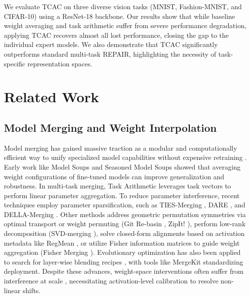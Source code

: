 \documentclass{article}
\theoremstyle{plain}
\theoremstyle{definition}
\theoremstyle{remark}
\begin{document}
We evaluate TCAC on three diverse vision tasks (MNIST, Fashion-MNIST, and CIFAR-10) using a ResNet-18 backbone. Our results show that while baseline weight averaging and task arithmetic suffer from severe performance degradation, applying TCAC recovers almost all lost performance, closing the gap to the individual expert models. We also demonstrate that TCAC significantly outperforms standard multi-task REPAIR, highlighting the necessity of task-specific representation spaces.

\section{Related Work}
\label{sec:related}

\subsection{Model Merging and Weight Interpolation}
Model merging has gained massive traction as a modular and computationally efficient way to unify specialized model capabilities without expensive retraining \cite{wortsman2022robust, ilharco2022editing, merger_survey2024}. Early work like Model Soups \cite{wortsman2022fi} and Seasoned Model Soups \cite{sharma2024seasoning} showed that averaging weight configurations of fine-tuned models can improve generalization and robustness. In multi-task merging, Task Arithmetic \cite{ilharco2022editing} leverages task vectors to perform linear parameter aggregation. To reduce parameter interference, recent techniques employ parameter sparsification, such as TIES-Merging \cite{yadav2023ties}, DARE \cite{yu2024dare}, and DELLA-Merging \cite{fan2024della}. Other methods address geometric permutation symmetries via optimal transport or weight permuting (Git Re-basin \cite{ainsworth2022git}, ZipIt! \cite{stoica2023zipit}), perform low-rank decomposition (SVD-merging \cite{gargiulo2025model, marczak2025model}), solve closed-form alignments based on activation metadata like RegMean \cite{jin2023regmean}, or utilize Fisher information matrices to guide weight aggregation (Fisher Merging \cite{matena2022merging}). Evolutionary optimization has also been applied to search for layer-wise blending recipes \cite{akiba2024evolutionary}, with tools like MergeKit \cite{goddard2024arcee} standardizing deployment. Despite these advances, weight-space interventions often suffer from interference at scale \cite{sanyal2024what}, necessitating activation-level calibration to resolve non-linear shifts.
\end{document}
